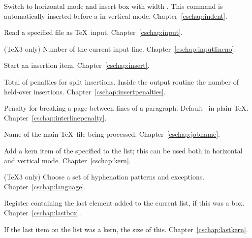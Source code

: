 \begin{glossinventory}
\item [\cs{indent}]
      Switch to horizontal mode and insert box with width .
      This command is automatically inserted before a
       in vertical mode.
Chapter~\ref{cschap:indent}.

\item [\cs{input\gr{file name}}]
      Read a specified file as \TeX\ input. 
Chapter~\ref{cschap:input}.

\item [\cs{inputlineno}]
      (\TeX3 only) 
      Number of the current input line.
Chapter~\ref{cschap:inputlineno}.

\item [\cs{insert\gr{8-bit number}\lb\gr{vertical mode material}\rb}]
      Start an insertion item.
Chapter~\ref{cschap:insert}.

\item [\cs{insertpenalties}]
      Total of penalties for split insertions.
      Inside the output routine the number of held-over insertions.
Chapter~\ref{cschap:insertpenalties}.

\item [\cs{interlinepenalty}]
      Penalty for breaking a page between lines of a paragraph. 
      Default~ in plain \TeX.
Chapter~\ref{cschap:interlinepenalty}.

\item [\cs{jobname}]
      Name of the main \TeX\ file being processed.
Chapter~\ref{cschap:jobname}.

\item [\cs{kern\gr{dimen}}]
      Add a kern item of the specified
       to the list;
      this can be used both in horizontal and vertical mode.
Chapter~\ref{cschap:kern}.

\item [\cs{language}]
      (\TeX3 only)
      Choose a set of hyphenation patterns and exceptions.
Chapter~\ref{cschap:language}.

\item [\cs{lastbox}]
      Register containing the last element  added to the current list, 
      if this was a box.
Chapter~\ref{cschap:lastbox}.

\item [\cs{lastkern}]
      If the last item on the list was a kern, the size of this.
Chapter~\ref{cschap:lastkern}.


\end{glossinventory}
